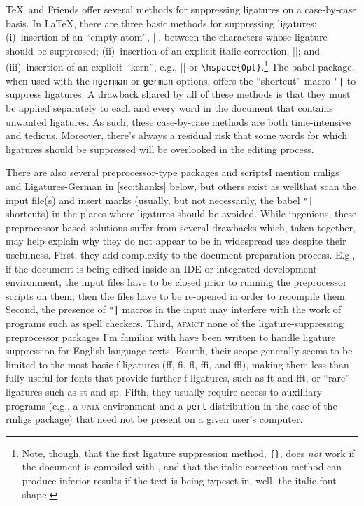 \documentclass[11pt]{article}
\newcommand{\pkg}[1]{\textsf{#1}}
\newcommand{\opt}[1]{\texttt{#1}}
\begin{document}
\TeX\ and Friends offer several methods for suppressing ligatures on a case-by-case basis. In \LaTeX, there are three basic methods for suppressing ligatures: (i)~insertion of an \enquote{empty atom}, |{}|, between the characters whose ligature should be suppressed; (ii)~insertion of an explicit italic correction, |\/|; and (iii)~insertion of an explicit \enquote{kern}, e.g., |\kern0pt| or \Verb/\hspace{0pt}/.\footnote{Note, though, that the first ligature suppression method, \Verb/{}/, does \emph{not} work if the document is compiled with \LuaLaTeX, and that the italic-correction method can produce inferior results if the text is being typeset in, well, the italic font shape.} The \pkg{babel} package, when used with the \opt{ngerman} or \opt{german} options, offers the \enquote{shortcut} macro \Verb/"|/ to suppress ligatures. A drawback shared by all of these methods is that they must be applied separately to each and every word in the document that contains unwanted ligatures. As such, these case-by-case methods are both time-intensive and tedious. Moreover, there's always a residual risk that some words for which ligatures should be suppressed will be overlooked in the editing process. 

There are also several preprocessor-type packages and scripts\textemdash I mention \pkg{rmligs} and \pkg{Ligatures-German} in \cref{sec:thanks} below, but others exist as well\textemdash that scan the input file(s) and insert marks (usually, but not necessarily, the \pkg{babel} \Verb/"|/ shortcuts) in the places where ligatures should be avoided. While ingenious, these preprocessor-based solutions suffer from several drawbacks which, taken together, may help explain why they do not appear to be in widespread use despite their usefulness. First, they add complexity to the document preparation process. E.g., if the document is being edited inside an IDE or integrated development environment, the input files have to be closed prior to running the preprocessor scripts on them; then the files have to be re-opened in order to recompile them. Second, the presence of \Verb+"|+ macros in the input may interfere with the work of programs such as spell checkers. Third, \textsc{afaict} none of the ligature-suppressing preprocessor packages I'm familiar with have been written to handle ligature suppression for English language texts. Fourth, their scope generally seems to be limited to the most basic f-ligatures (ff, fi, fl, ffi, and ffl), making them less than fully useful for fonts that provide further f-ligatures, such as ft and fft, or \enquote{rare} ligatures such as st and sp. Fifth, they usually require access to auxilliary programs (e.g., a \textsc{unix} environment and a \opt{perl} distribution in the case of the \pkg{rmligs} package) that need not be present on a given user's computer. 
\end{document}

